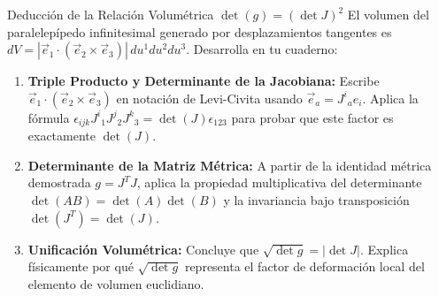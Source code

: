 \documentclass[10pt,aspectratio=169]{beamer}
\begin{document}
\begin{frame}{Deducción de la Relación Volumétrica $\det(g) = (\det J)^2$}
  \vspace{0.05cm}
  El volumen del paralelepípedo infinitesimal generado por desplazamientos tangentes es $dV = |\vec{e}_1 \cdot (\vec{e}_2 \times \vec{e}_3)|\, du^1 du^2 du^3$. Desarrolla en tu cuaderno:
  \vspace{0.22cm}
  \begin{enumerate}\itemsep10pt
    \item[(a)] \textbf{Triple Producto y Determinante de la Jacobiana:} Escribe $\vec{e}_1 \cdot (\vec{e}_2 \times \vec{e}_3)$ en notación de Levi-Civita usando $\vec{e}_a = J^i{}_a \hat{e}_i$. Aplica la fórmula $\epsilon_{ijk} J^i{}_1 J^j{}_2 J^k{}_3 = \det(J)\epsilon_{123}$ para probar que este factor es exactamente $\det(J)$.
    \item[(b)] \textbf{Determinante de la Matriz Métrica:} A partir de la identidad métrica demostrada $g = J^T J$, aplica la propiedad multiplicativa del determinante $\det(A B) = \det(A)\det(B)$ y la invariancia bajo transposición $\det(J^T) = \det(J)$.
    \item[(c)] \textbf{Unificación Volumétrica:} Concluye que $\sqrt{\det g} = |\det J|$. Explica físicamente por qué $\sqrt{\det g}$ representa el factor de deformación local del elemento de volumen euclidiano.
  \end{enumerate}
\end{frame}
\end{document}
